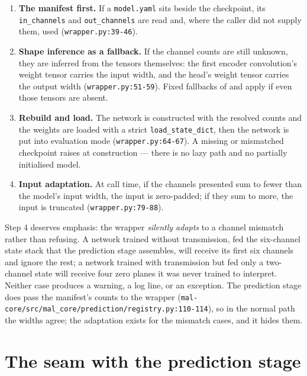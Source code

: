 \documentclass[11pt,a4paper]{article}
\newcommand{\codex}[1]{\texttt{#1}}
\begin{document}
\begin{enumerate}
\item \textbf{The manifest first.} If a \codex{model.yaml} sits beside the
      checkpoint, its \codex{in\_\allowbreak{}channels} and \codex{out\_\allowbreak{}channels} are read
      and, where the caller did not supply them, used
      (\codex{wrapper.py:39-46}).
\item \textbf{Shape inference as a fallback.} If the channel counts are still
      unknown, they are inferred from the tensors themselves: the first
      encoder convolution's weight tensor carries the input width, and the
      head's weight tensor carries the output width
      (\codex{wrapper.py:51-59}). Fixed fallbacks of
       and
       apply if even
      those tensors are absent.
\item \textbf{Rebuild and load.} The network is constructed with the
      resolved counts and the weights are loaded with a strict
      \codex{load\_\allowbreak{}state\_\allowbreak{}dict}, then the network is put into evaluation mode
      (\codex{wrapper.py:64-67}). A missing or mismatched checkpoint raises at
      construction --- there is no lazy path and no partially initialised
      model.
\item \textbf{Input adaptation.} At call time, if the channels presented sum
      to fewer than the model's input width, the input is zero-padded; if
      they sum to more, the input is truncated
      (\codex{wrapper.py:79-88}).
\end{enumerate}

Step 4 deserves emphasis: the wrapper \emph{silently adapts} to a channel
mismatch rather than refusing. A network trained without transmission, fed
the six-channel state stack that the prediction stage assembles, will receive
its first six channels and ignore the rest; a network trained with
transmission but fed only a two-channel state will receive four zero planes
it was never trained to interpret. Neither case produces a warning, a log
line, or an exception. The prediction stage does pass the manifest's counts
to the wrapper (\codex{mal-core/\allowbreak{}src/\allowbreak{}mal\_\allowbreak{}core/\allowbreak{}prediction/\allowbreak{}registry.py:110-114}),
so in the normal path the widths agree; the adaptation exists for the
mismatch cases, and it hides them.

\section{The seam with the prediction stage}
\end{document}

